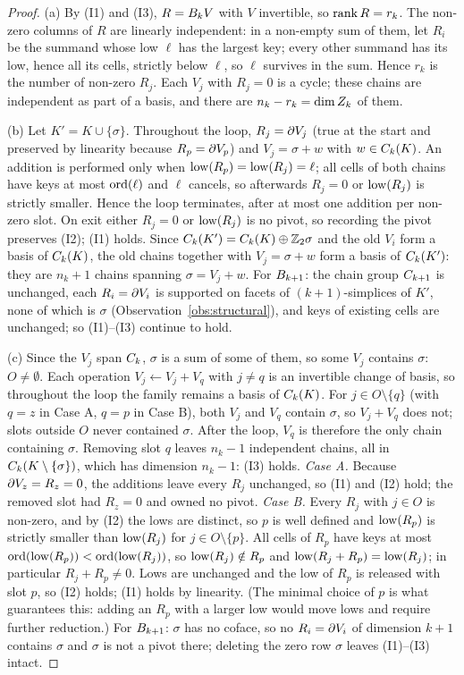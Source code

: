 \begin{proof}
(a) By (I1) and (I3), $R=B_{k}V$ with $V$ invertible, so $\operatorname{rank} R=r_k$. The
non-zero columns of $R$ are linearly independent: in a non-empty sum of them,
let $R_i$ be the summand whose low $\ell$ has the largest key; every other
summand has its low, hence all its cells, strictly below $\ell$, so $\ell$
survives in the sum. Hence $r_k$ is the number of non-zero $R_j$. Each $V_j$ with
$R_j=0$ is a cycle; these chains are independent as part of a basis, and there
are $n_k-r_k=\dim Z_{k}$ of them.

(b) Let $K'=K\cup\{\sigma\}$. Throughout the loop, $R_j=\partial V_j$ (true at the
start and preserved by linearity because $R_p=\partial V_p$) and $V_j=\sigma+w$ with
$w\in C_{k}(K)$. An addition is performed only when $\operatorname{low}(R_p)=\operatorname{low}(R_j)=\ell$;
all cells of both chains have keys at most $\operatorname{ord}(\ell)$ and $\ell$ cancels, so
afterwards $R_j=0$ or $\operatorname{low}(R_j)$ is strictly smaller. Hence the loop
terminates, after at most one addition per non-zero slot. On exit either
$R_j=0$ or $\operatorname{low}(R_j)$ is no pivot, so recording the pivot preserves (I2); (I1)
holds. Since $C_{k}(K')=C_{k}(K)\oplus\mathbb{Z}_2\sigma$ and the old $V_i$ form a basis
of $C_{k}(K)$, the old chains together with $V_j=\sigma+w$ form a basis of
$C_{k}(K')$: they are $n_k+1$ chains spanning $\sigma=V_j+w$. For $B_{k+1}$:
the chain group $C_{k+1}$ is unchanged, each $R_i=\partial V_i$ is supported on facets
of $(k+1)$-simplices of $K'$, none of which is $\sigma$
(Observation~\ref{obs:structural}), and keys of existing cells are unchanged;
so (I1)--(I3) continue to hold.

(c) Since the $V_j$ span $C_{k}$, $\sigma$ is a sum of some of them, so some
$V_j$ contains $\sigma$: $O\ne\emptyset$. Each operation $V_j\gets V_j+V_q$ with
$j\ne q$ is an invertible change of basis, so throughout the loop the family
remains a basis of $C_{k}(K)$. For $j\in O\setminus\{q\}$ (with $q=z$ in Case A,
$q=p$ in Case B), both $V_j$ and $V_q$ contain $\sigma$, so $V_j+V_q$ does not;
slots outside $O$ never contained $\sigma$. After the loop, $V_q$ is therefore
the only chain containing $\sigma$. Removing slot $q$ leaves $n_k-1$ independent
chains, all in $C_{k}(K\setminus\{\sigma\})$, which has dimension $n_k-1$:
(I3) holds.
\emph{Case A.} Because $\partial V_z=R_z=0$, the additions leave every $R_j$
unchanged, so (I1) and (I2) hold; the removed slot had $R_z=0$ and owned no
pivot.
\emph{Case B.} Every $R_j$ with $j\in O$ is non-zero, and by (I2) the lows are
distinct, so $p$ is well defined and $\operatorname{low}(R_p)$ is strictly smaller than
$\operatorname{low}(R_j)$ for $j\in O\setminus\{p\}$. All cells of $R_p$ have keys at most
$\operatorname{ord}(\operatorname{low}(R_p))<\operatorname{ord}(\operatorname{low}(R_j))$, so $\operatorname{low}(R_j)\notin R_p$ and
$\operatorname{low}(R_j+R_p)=\operatorname{low}(R_j)$; in particular $R_j+R_p\ne0$. Lows are unchanged and
the low of $R_p$ is released with slot $p$, so (I2) holds; (I1) holds by
linearity. (The minimal choice of $p$ is what guarantees this: adding an $R_p$
with a larger low would move lows and require further reduction.)
For $B_{k+1}$: $\sigma$ has no coface, so no $R_i=\partial V_i$ of dimension $k+1$
contains $\sigma$ and $\sigma$ is not a pivot there; deleting the zero row
$\sigma$ leaves (I1)--(I3) intact.


\end{proof}
